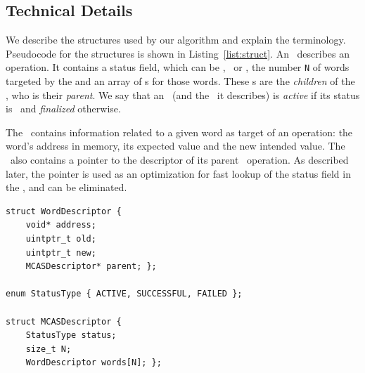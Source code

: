 
\subsection{Technical Details}

We describe the structures used by our algorithm and explain the terminology. 
Pseudocode for the structures is shown in Listing~\ref{list:struct}. 
An \mcasdescriptor\ describes an \mcas{} operation. It contains a status field, which can be \ttactive, \successful\ or \failed, 
the number \texttt{N} of words targeted by the \mcas{} and an array of {\worddescriptor}s for those words. 
These {\worddescriptor}s are the \emph{children} of the \mcasdescriptor, who is their \emph{parent}. 
We say that an \mcasdescriptor\ (and the \mcas\ it describes) is \emph{active} if its status is \ttactive\ and 
\emph{finalized} otherwise. 

The \worddescriptor\ contains information related to a given word as target of an \mcas{} operation: the word's address in memory, its expected value and the new intended value. 
The \worddescriptor\ also contains a pointer to the descriptor of its parent \mcas\ operation.
As described later, the pointer is used as an optimization for fast lookup of the status field in the \mcasdescriptor, and can be eliminated.

\begin{lstlisting}[caption={Data structures used by our algorithm},label=list:struct,numbers=none,float,keywords={}]
struct WordDescriptor {
    void* address;
    uintptr_t old;
    uintptr_t new;
    MCASDescriptor* parent; };
    
enum StatusType { ACTIVE, SUCCESSFUL, FAILED };

struct MCASDescriptor {
    StatusType status;
    size_t N;
    WordDescriptor words[N]; };
\end{lstlisting}


